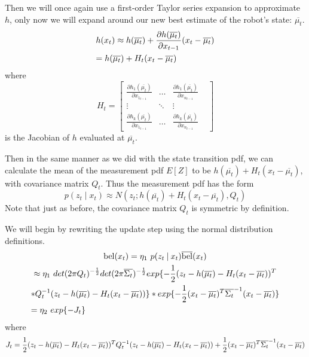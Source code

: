 Then we will once again use a first-order Taylor series expansion to approximate \(h\), only now we will expand around our new best estimate of the robot's state: \(\overline{\mu_t}\).
\begin{multline*}
h(x_t) \approx h(\overline{\mu_t}) + \frac{\partial h(\overline{\mu_t})}{\partial x_{t-1}} (x_t - \overline{\mu_t}) \\
= h(\overline{\mu_t}) + H_t (x_t - \overline{\mu_t}) \hfill
\end{multline*}
where \[
H_t = \begin{bmatrix} 
\frac{\partial h_1(\overline{\mu_t})}{\partial x_{1_{t-1}}} & \dots & \frac{\partial h_1(\overline{\mu_t})}{\partial x_{n_{t-1}}}\\
\vdots & \ddots & \vdots & \\
\frac{\partial h_k(\overline{\mu_t})}{\partial x_{1_{t-1}}} & \dots & \frac{\partial h_k(\overline{\mu_t})}{\partial x_{n_{t-1}}} 
\end{bmatrix} \] is the Jacobian of \(h\) evaluated at \(\overline{\mu_t}\).

Then in the same manner as we did with the state transition pdf, we can calculate the mean of the measurement pdf \(E[Z]\) to be \(h(\overline{\mu_t}) + H_t (x_t - \overline{\mu_t})\), with covariance matrix \(Q_t\). Thus the measurement pdf has the form \[p(z_t \mathbin{\vert} x_t)  \approx N(z_t;h(\overline{\mu_t}) + H_t (x_t - \overline{\mu_t}),Q_t)\] Note that just as before, the covariance matrix \(Q_t\) is symmetric by definition.

We will begin by rewriting the update step using the normal distribution definitions.
\begin{multline*}
\bel(x_t) = \eta_1\ p(z_t \mathbin{\vert} x_t) \overline{\bel}(x_t) \\
\approx \eta_1\ det(2 \pi Q_t)^{-\frac{1}{2}} det(2 \pi \overline{\Sigma_t})^{-\frac{1}{2}} exp\{-\frac{1}{2} (z_t - h(\overline{\mu_t}) - H_t (x_t - \overline{\mu_t}))^T \\ * Q_t^{-1} (z_t - h(\overline{\mu_t}) - H_t (x_t - \overline{\mu_t}))\} * exp \{-\frac{1}{2} (x_t - \overline{\mu_t})^T \overline{\Sigma_t}^{-1} (x_t - \overline{\mu_t}) \} \\
= \eta_2\ exp\{-J_t\} \hfill
\end{multline*} where \[
J_t = \frac{1}{2} (z_t - h(\overline{\mu_t}) - H_t (x_t - \overline{\mu_t}))^T Q_t^{-1} (z_t - h(\overline{\mu_t}) - H_t (x_t - \overline{\mu_t})) \\
+ \frac{1}{2} (x_t - \overline{\mu_t})^T \overline{\Sigma_t}^{-1} (x_t - \overline{\mu_t})
\]

